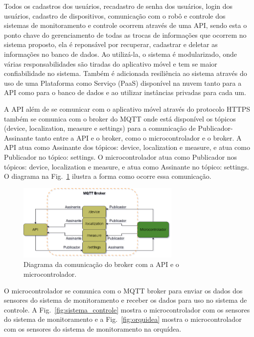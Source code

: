 \documentclass[conference]{IEEEtran}
\begin{document}
Todos os cadastros dos usuários, recadastro de senha dos usuários, login dos usuários, cadastro de dispositivos, comunicação com o robô e controle dos sistemas de monitoramento e controle ocorrem através de uma API, sendo esta o ponto chave do gerenciamento de todas as trocas de informações que ocorrem no sistema proposto, ela é reponsável por recuperar, cadastrar e deletar as informações no banco de dados. Ao utilizá-la, o sistema é modularizado, onde várias responsabilidades são tiradas do aplicativo móvel e tem se maior confiabilidade no sistema. Também é adicionada resiliência ao sistema através do uso de uma Plataforma como Serviço (PaaS) disponível na nuvem tanto para a API como para o banco de dados e ao utilizar instâncias privadas para cada um.

A API além de se comunicar com o aplicativo móvel através do protocolo HTTPS também se comunica com o broker do MQTT onde está disponível os tópicos (device, localization, measure e settings) para a comunicação de Publicador-Assinante tanto entre a API e o broker, como o microcontrolador e o broker. A API atua como Assinante dos tópicos: device, localization e measure, e atua como Publicador no tópico: settings. O microcontrolador atua como Publicador nos tópicos: device, localization e measure, e atua como Assinante no tópico: settings. O diagrama na Fig.~\ref{fig:mqtt_broker} ilustra a forma como ocorre essa comunicação. 

\begin{figure}
    \centering
    \includegraphics[width=8cm]{mqtt_broker.png}
    \caption{Diagrama da comunicação do broker com a API e o microcontrolador.}
    \label{fig:mqtt_broker}
\end{figure}

O microcontrolador se comunica com o MQTT broker para enviar os dados dos sensores do sistema de monitoramento e receber os dados para uso no sistema de controle. A Fig.~\ref{fig:sistema_controle} mostra o microcontrolador com os sensores do sistema de monitoramento e a Fig.~\ref{fig:orquidea} mostra o microcontrolador com os sensores do sistema de monitoramento na orquídea.
\end{document}
